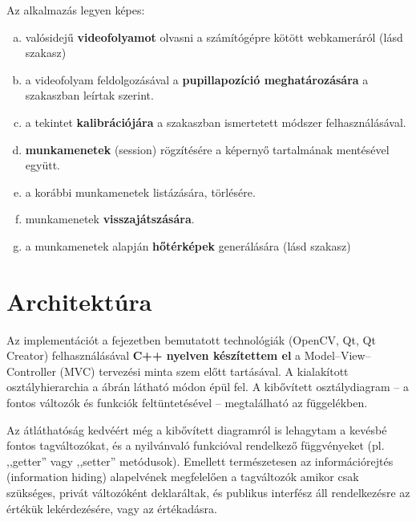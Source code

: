 \bigskip

Az alkalmazás legyen képes:

\begin{enumerate}[a)]
  \item valósidejű \textbf{videofolyamot} olvasni a számítógépre kötött webkameráról (lásd  szakasz)
  \item a videofolyam feldolgozásával a \textbf{pupillapozíció meghatározására} a  szakaszban leírtak szerint.
  \item a tekintet \textbf{kalibrációjára} a  szakaszban ismertetett módszer felhasználásával.
  \item \textbf{munkamenetek} (session) rögzítésére a képernyő tartalmának mentésével együtt.
  \item a korábbi munkamenetek listázására, törlésére.
  \item munkamenetek \textbf{visszajátszására}.
  \item a munkamenetek alapján \textbf{hőtérképek} generálására (lásd  szakasz)
\end{enumerate}

\section{Architektúra}\label{sect:architektura}
  
  Az implementációt a  fejezetben bemutatott technológiák (OpenCV, Qt, Qt Creator) felhasználásával \textbf{C++ nyelven készítettem el} a Model--View--Controller (MVC) tervezési minta szem előtt tartásával. A kialakított osztályhierarchia a  ábrán látható módon épül fel. A kibővített osztálydiagram  -- a fontos változók és funkciók feltüntetésével -- megtalálható az  függelékben.
  
  Az átláthatóság kedvéért még a kibővített diagramról is lehagytam a kevésbé fontos tagváltozókat, és a nyilvánvaló funkcióval rendelkező függvényeket (pl. ,,getter'' vagy ,,setter'' metódusok). Emellett természetesen az információrejtés (information hiding) alapelvének megfelelően a tagváltozók amikor csak szükséges, privát változóként deklaráltak, és publikus interfész áll rendelkezésre az értékük lekérdezésére, vagy az értékadásra.

